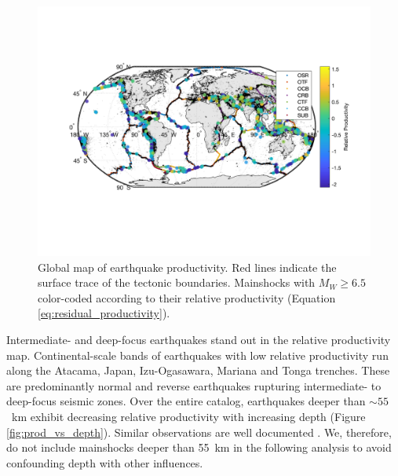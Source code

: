 \documentclass[draft, jgrga]{agujournal2018}
\begin{document}
    \begin{figure}
    \includegraphics[width = \linewidth]{worldmap_res.png}
        \caption{Global map of earthquake productivity. Red lines indicate the surface trace of the tectonic boundaries. Mainshocks with $M_W\ge6.5$ color-coded according to their relative productivity (Equation \ref{eq:residual_productivity}).
        }
        \label{fig:global_res}
    \end{figure}

    Intermediate- and deep-focus earthquakes stand out in the relative productivity map. Continental-scale bands of earthquakes with low relative productivity run along the Atacama, Japan, Izu-Ogasawara, Mariana and Tonga trenches. These are predominantly normal and reverse earthquakes rupturing intermediate- to deep-focus seismic zones. Over the entire catalog, earthquakes deeper than $\sim55$~km exhibit decreasing relative productivity with increasing depth (Figure \ref{fig:prod_vs_depth}). Similar observations are well documented \citep{Bath1965LateralMantle, Frohlich1989TheEarthquakes, Nyffenegger2000, Wiens1997AftershockZone, Wu1999, Houston2004}. We, therefore, do not include mainshocks deeper than 55~km  in the following analysis to avoid confounding depth with other influences.
\end{document}
